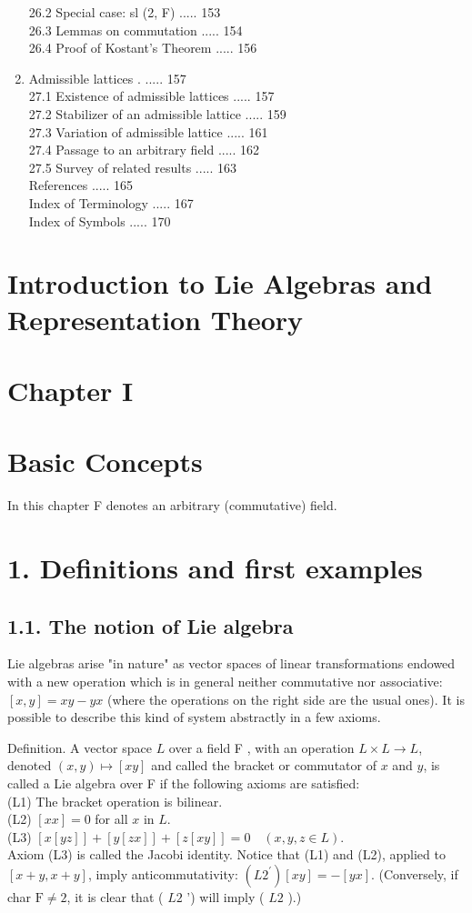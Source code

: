 \documentclass[10pt]{article}
\begin{document}
\begin{enumerate}
26.2 Special case: sl (2, F) ..... 153\\
26.3 Lemmas on commutation ..... 154\\
26.4 Proof of Kostant's Theorem ..... 156
  \item Admissible lattices . ..... 157\\
27.1 Existence of admissible lattices ..... 157\\
27.2 Stabilizer of an admissible lattice ..... 159\\
27.3 Variation of admissible lattice ..... 161\\
27.4 Passage to an arbitrary field ..... 162\\
27.5 Survey of related results ..... 163\\
References ..... 165\\
Index of Terminology ..... 167\\
Index of Symbols ..... 170
\end{enumerate}

\section*{Introduction to Lie Algebras and Representation Theory}
\section*{Chapter I}
\section*{Basic Concepts}
In this chapter F denotes an arbitrary (commutative) field.

\section*{1. Definitions and first examples}
\subsection*{1.1. The notion of Lie algebra}
Lie algebras arise "in nature" as vector spaces of linear transformations endowed with a new operation which is in general neither commutative nor associative: $[x, y]=x y-y x$ (where the operations on the right side are the usual ones). It is possible to describe this kind of system abstractly in a few axioms.

Definition. A vector space $L$ over a field F , with an operation $L \times L \rightarrow L$, denoted $(x, y) \mapsto[x y]$ and called the bracket or commutator of $x$ and $y$, is called a Lie algebra over F if the following axioms are satisfied:\\
(L1) The bracket operation is bilinear.\\
(L2) $[x x]=0$ for all $x$ in $L$.\\
(L3) $[x[y z]]+[y[z x]]+[z[x y]]=0 \quad(x, y, z \in L)$.\\
Axiom (L3) is called the Jacobi identity. Notice that (L1) and (L2), applied to $[x+y, x+y]$, imply anticommutativity: $\left(L 2^{\prime}\right)[x y]=-[y x]$. (Conversely, if char $\mathrm{F} \neq 2$, it is clear that ( $L 2$ ') will imply ( $L 2$ ).)
\end{document}
